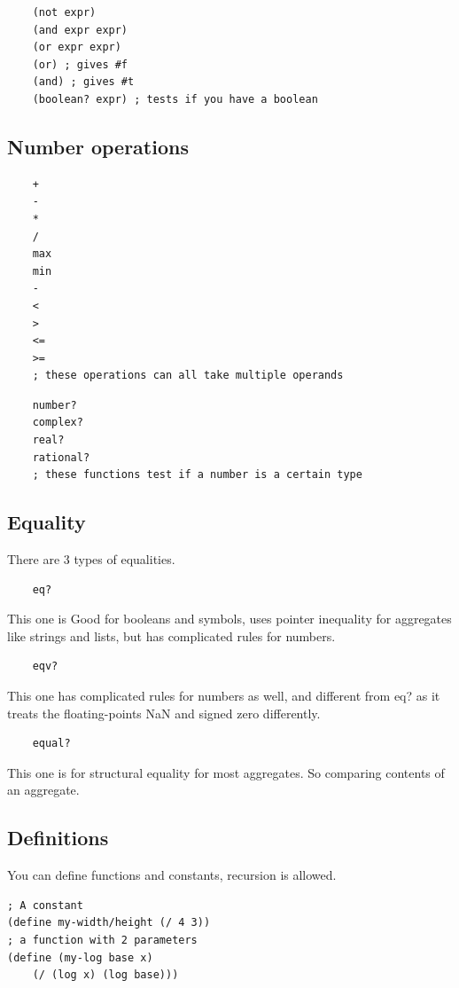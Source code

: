 \documentclass[12pt]{article}
\begin{document}
\begin{lstlisting}
    (not expr)
    (and expr expr)
    (or expr expr)
    (or) ; gives #f
    (and) ; gives #t
    (boolean? expr) ; tests if you have a boolean
\end{lstlisting}

\subsection{Number operations}

\begin{lstlisting}
    +
    -
    *
    /
    max
    min
    -
    <
    >
    <=
    >=
    ; these operations can all take multiple operands
\end{lstlisting}

\begin{lstlisting}
    number?
    complex?
    real?
    rational?
    ; these functions test if a number is a certain type
\end{lstlisting}

\subsection{Equality}

There are 3 types of equalities.

\begin{lstlisting}
    eq?
\end{lstlisting}
	This one is Good for booleans and symbols, uses pointer inequality for aggregates like strings and lists, but has complicated rules for numbers.

\begin{lstlisting}
    eqv?
\end{lstlisting}
	This one has complicated rules for numbers as well, and different from eq? as it treats the floating-points NaN and signed zero differently.

	\begin{lstlisting}
    equal?
\end{lstlisting}
This one is for structural equality for most aggregates. So comparing contents of an aggregate.

\subsection{Definitions}

You can define functions and constants, recursion is allowed.

\begin{lstlisting}
; A constant
(define my-width/height (/ 4 3))
; a function with 2 parameters
(define (my-log base x)
	(/ (log x) (log base)))

\end{lstlisting}
\end{document}
